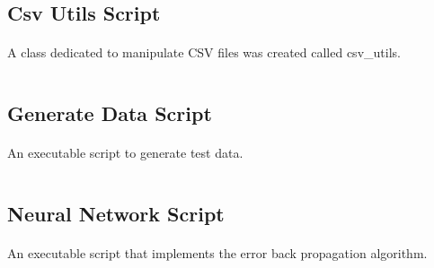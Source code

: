 \documentclass[11pt, a4paper]{article}
\begin{document}
    \subsection{Csv Utils Script}
    \paragraph{} A class dedicated to manipulate CSV files was created called csv\_utils.
    \inputminted{python}{../utils/csv_utils.py}
    \subsection{Generate Data Script}
    \paragraph{} An executable script to generate test data.
    \inputminted{python}{../generate_test_data.py}
    \subsection{Neural Network Script}
    \paragraph{} An executable script that implements the error back propagation algorithm.
    \inputminted{python}{../neural_net.py}
\end{document}
